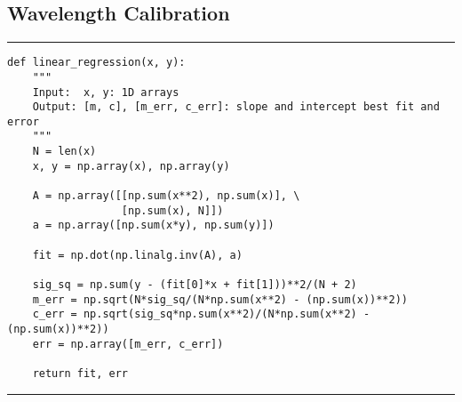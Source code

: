 \documentclass[preprint]{aastex62}
\begin{document}
\subsection{Wavelength Calibration} \label{code:stats}
\small
\hrule
\begin{lstlisting}
def linear_regression(x, y):
    """
    Input:  x, y: 1D arrays
    Output: [m, c], [m_err, c_err]: slope and intercept best fit and error
    """
    N = len(x)
    x, y = np.array(x), np.array(y)

    A = np.array([[np.sum(x**2), np.sum(x)], \
                  [np.sum(x), N]])
    a = np.array([np.sum(x*y), np.sum(y)])

    fit = np.dot(np.linalg.inv(A), a)

    sig_sq = np.sum(y - (fit[0]*x + fit[1]))**2/(N + 2)
    m_err = np.sqrt(N*sig_sq/(N*np.sum(x**2) - (np.sum(x))**2))
    c_err = np.sqrt(sig_sq*np.sum(x**2)/(N*np.sum(x**2) - (np.sum(x))**2))
    err = np.array([m_err, c_err])

    return fit, err
\end{lstlisting}
\hrule \vspace{7pt}
\end{document}
